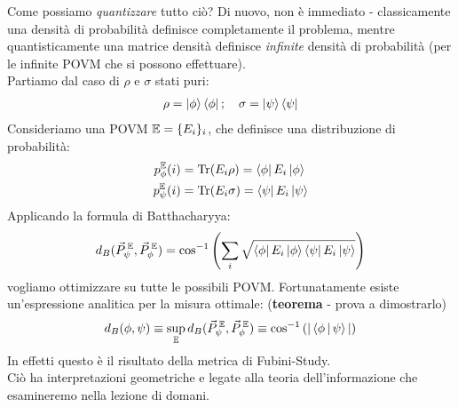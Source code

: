 \documentclass[../../InformazioneQuantistica.tex]{subfiles}
\begin{document}
Come possiamo \textit{quantizzare} tutto ciò? Di nuovo, non è immediato - classicamente una densità di probabilità definisce completamente il problema, mentre quantisticamente  una matrice densità definisce \textit{infinite} densità di probabilità (per le infinite POVM che si possono effettuare).\\
Partiamo dal caso di $\rho$ e $\sigma$ stati puri:
\begin{align*}
\rho = \Ket{\phi}\Bra{\phi}; \quad \sigma = \Ket{\psi}\Bra{\psi}
\end{align*}
Consideriamo una POVM $\mathbb{E}=\{E_i\}_i$, che definisce una distribuzione di probabilità:
\begin{align*}
p_\phi^{\mathbb{E}} (i) &= \operatorname{Tr}(E_i \rho) = \Bra{\phi}E_i \Ket{\phi}\\
p_\psi^{\mathbb{E}}(i) &= \operatorname{Tr}(E_i \sigma) = \Bra{\psi}E_i \Ket{\psi}
\end{align*}
Applicando la formula di Batthacharyya:
\begin{align*}
d_B(\vec{P}_\psi^{\>\mathbb{E}}, \vec{P}_{\phi}^{\>\mathbb{E}}) = \cos^{-1}\left( \sum_i \sqrt{\Bra{\phi}E_i \Ket{\phi} \Bra{\psi}E_i \Ket{\psi}}\right)
\end{align*}
vogliamo ottimizzare su tutte le possibili POVM. Fortunatamente esiste un'espressione analitica per la misura ottimale: (\textbf{teorema} - prova a dimostrarlo)
\begin{align*}
d_B(\phi, \psi) \equiv \sup_{\mathbb{E}} d_B(\vec{P}_{\psi}^{\>\mathbb{E}}, \vec{P}_\phi^{\>\mathbb{E}}) \equiv \cos^{-1}\left(|\Braket{\phi|\psi}|\right)
\end{align*}
In effetti questo è il risultato della metrica di Fubini-Study.\\
Ciò ha interpretazioni geometriche e legate alla teoria dell'informazione che esamineremo nella lezione di domani.
\end{document}
